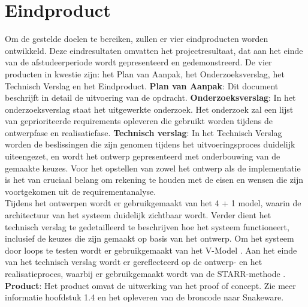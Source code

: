 \section{Eindproduct}
Om de gestelde doelen te bereiken, zullen er vier eindproducten worden ontwikkeld.
Deze eindresultaten omvatten het projectresultaat, dat aan het einde van de afstudeerperiode wordt gepresenteerd en gedemonstreerd.
De vier producten in kwestie zijn: het Plan van Aanpak, het Onderzoeksverslag, het Technisch Verslag en het Eindproduct.
\whitespace
\textbf{Plan van Aanpak}: Dit document beschrijft in detail de uitvoering van de opdracht.
\whitespace
\textbf{Onderzoeksverslag}: In het onderzoeksverslag staat het uitgewerkte onderzoek.
Het onderzoek zal een lijst van geprioriteerde requirements opleveren die gebruikt worden tijdens de ontwerpfase en realisatiefase.
\whitespace
\textbf{Technisch verslag}: In het Technisch Verslag worden de beslissingen die zijn genomen tijdens het uitvoeringsproces duidelijk uiteengezet, en wordt het ontwerp gepresenteerd met onderbouwing van de gemaakte keuzes.
Voor het opstellen van zowel het ontwerp als de implementatie is het van cruciaal belang om rekening te houden met de eisen en wensen die zijn voortgekomen uit de requirementanalyse. \\
Tijdens het ontwerpen wordt er gebruikgemaakt van het 4 + 1 model, waarin de architectuur van het systeem duidelijk zichtbaar wordt.
Verder dient het technisch verslag te gedetailleerd te beschrijven hoe het systeem functioneert, inclusief de keuzes die zijn gemaakt op basis van het ontwerp.
Om het systeem door loops te testen wordt er gebruikgemaakt van het V-Model \Parencite{VModel}.
Aan het einde van het technisch verslag wordt er gereflecteerd op de ontwerp- en het realisatieproces, waarbij er gebruikgemaakt wordt van de STARR-methode \Parencite{STARR}.
\whitespace
\textbf{Product}: Het product omvat de uitwerking van het proof of concept. Zie meer informatie hoofdstuk 1.4 en het opleveren van de broncode naar Snakeware.

